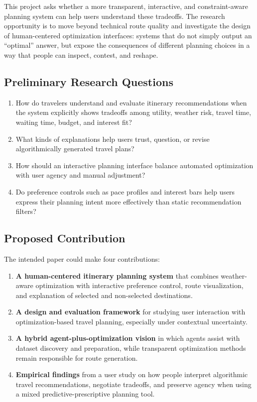 \documentclass[11pt,a4paper]{article}
\begin{document}
This project asks whether a more transparent, interactive, and constraint-aware planning system can help users understand these tradeoffs. The research opportunity is to move beyond technical route quality and investigate the design of human-centered optimization interfaces: systems that do not simply output an ``optimal'' answer, but expose the consequences of different planning choices in a way that people can inspect, contest, and reshape.

\subsection*{Preliminary Research Questions}

\begin{enumerate}
    \item How do travelers understand and evaluate itinerary recommendations when the system explicitly shows tradeoffs among utility, weather risk, travel time, waiting time, budget, and interest fit?
    \item What kinds of explanations help users trust, question, or revise algorithmically generated travel plans?
    \item How should an interactive planning interface balance automated optimization with user agency and manual adjustment?
    \item Do preference controls such as pace profiles and interest bars help users express their planning intent more effectively than static recommendation filters?
\end{enumerate}

\subsection*{Proposed Contribution}

\noindent The intended paper could make four contributions:

\begin{enumerate}
    \item \textbf{A human-centered itinerary planning system} that combines weather-aware optimization with interactive preference control, route visualization, and explanation of selected and non-selected destinations.
    \item \textbf{A design and evaluation framework} for studying user interaction with optimization-based travel planning, especially under contextual uncertainty.
    \item \textbf{A hybrid agent-plus-optimization vision} in which agents assist with dataset discovery and preparation, while transparent optimization methods remain responsible for route generation.
    \item \textbf{Empirical findings} from a user study on how people interpret algorithmic travel recommendations, negotiate tradeoffs, and preserve agency when using a mixed predictive-prescriptive planning tool.
\end{enumerate}
\end{document}
